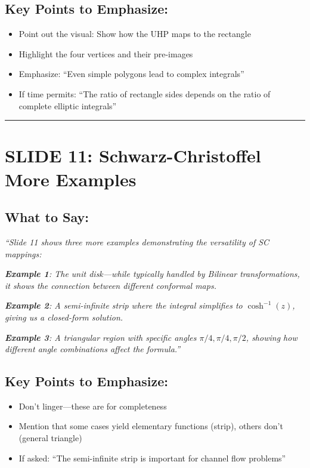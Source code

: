 \documentclass[12pt,a4paper]{article}
\begin{document}
\subsection*{Key Points to Emphasize:}
\begin{itemize}[leftmargin=*]
    \item Point out the visual: Show how the UHP maps to the rectangle
    \item Highlight the four vertices and their pre-images
    \item Emphasize: ``Even simple polygons lead to complex integrals''
    \item If time permits: ``The ratio of rectangle sides depends on the ratio of complete elliptic integrals''
\end{itemize}

\vspace{10pt}
\hrule
\vspace{10pt}

\section*{SLIDE 11: Schwarz-Christoffel More Examples}

\subsection*{What to Say:}
\begin{quotebox}
\textit{``Slide 11 shows three more examples demonstrating the versatility of SC mappings:}

\textit{\textbf{Example 1}: The unit disk---while typically handled by Bilinear transformations, it shows the connection between different conformal maps.}

\textit{\textbf{Example 2}: A semi-infinite strip where the integral simplifies to $\cosh^{-1}(z)$, giving us a closed-form solution.}

\textit{\textbf{Example 3}: A triangular region with specific angles $\pi/4, \pi/4, \pi/2$, showing how different angle combinations affect the formula.''}
\end{quotebox}

\subsection*{Key Points to Emphasize:}
\begin{itemize}[leftmargin=*]
    \item Don't linger---these are for completeness
    \item Mention that some cases yield elementary functions (strip), others don't (general triangle)
    \item If asked: ``The semi-infinite strip is important for channel flow problems''
\end{itemize}
\end{document}
